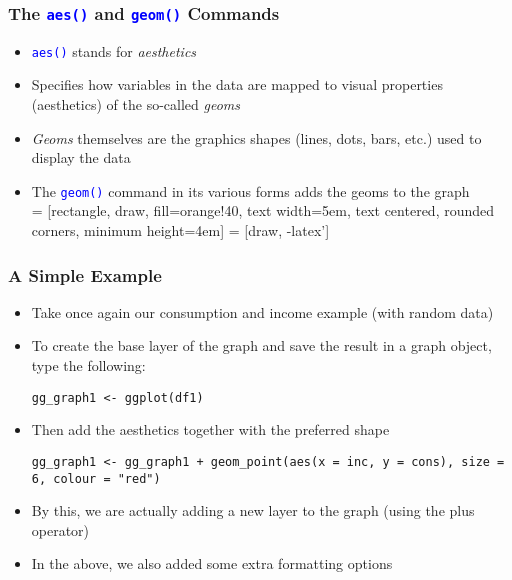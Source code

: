 \documentclass[10pt]{beamer}
\newcommand{\cc}[1]{\texttt{\textcolor{blue}{#1}}}
\theoremstyle{definition}
\begin{document}
\begin{frame}[fragile]
\frametitle{The \cc{aes()} and \cc{geom()} Commands}
\begin{itemize}
	\item \cc{aes()} stands for \emph{aesthetics}
	\item Specifies how variables in the data are mapped to visual properties (aesthetics) of the so-called \emph{geoms}
	\item \emph{Geoms} themselves are the graphics shapes (lines, dots, bars, etc.) used to display the data
	\item The \cc{geom()} command in its various forms adds the geoms to the graph
	\bigskip\\
	 = [rectangle, draw, fill=orange!40, 
    text width=5em, text centered, rounded corners, minimum height=4em]
 = [draw, -latex']

\begin{center}
\end{center} 
\end{itemize}
\end{frame}

\begin{frame}[fragile]
\frametitle{A Simple Example}
\begin{itemize}
	\item Take once again our consumption and income example (with random data)
	\item To create the base layer of the graph and save the result in a graph object, type the following:
	\begin{lstlisting}[style = rstyle, breaklines]
	gg_graph1 <- ggplot(df1)
	\end{lstlisting}
	\item Then add the aesthetics together with the preferred shape
	\begin{lstlisting}[style = rstyle, breaklines]
	gg_graph1 <- gg_graph1 + geom_point(aes(x = inc, y = cons), size = 6, colour = "red")
	\end{lstlisting}
	\item By this, we are actually adding a new layer to the graph (using the plus operator)
	\item In the above, we also added some extra formatting options
\end{itemize}
\end{frame} 
\end{document}
